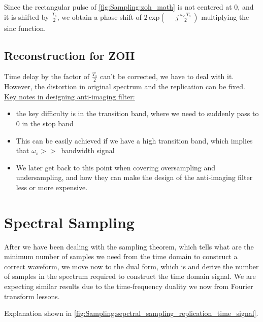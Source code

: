 \documentclass[12pt,a4paper]{book}
\begin{document}
Since the rectangular pulse of \autoref{fig:Sampling:zoh_math} is not centered at 0, and it is shifted by $\displaystyle\frac{T_s}{2}$, we obtain a phase shift of $ 2 \, \text{exp}\left( \, -j \, \displaystyle\frac{\omega_c \, T_s}{2} \, \right)$ multiplying the sinc function.


\subsection{Reconstruction for ZOH}


Time delay by the factor of  $\displaystyle\frac{T_s}{2}$ can't be corrected, we have to deal with it. However, the distortion in original spectrum and the replication can be fixed.\\

\underline{Key notes in designing anti-imaging filter:}

\begin{itemize}

\item the key difficulty is in the transition band, where we need to suddenly pass to 0 in the stop band

\item This can be easily achieved if we have a high transition band, which implies that $\omega_s >> \,$ bandwidth signal

\item We later get back to this point when covering oversampling and undersampling, and how they can make the design of the anti-imaging filter less or more expensive.

\end{itemize}




\newpage
\section{Spectral Sampling}
\label{Sec:Sampling:Sepctral_Sampling}


After we have been dealing with the sampling theorem, which tells what are the minimum number of samples we need from the time domain to construct a correct waveform, we move now to the dual form, which is  and derive the number of samples in the spectrum required to construct the time domain signal. We are expecting similar results due to the time-frequency duality we now from Fourier transform lessons.

Explanation shown in \autoref{fig:Sampling:sepctral_sampling_replication_time_signal}.
\end{document}
